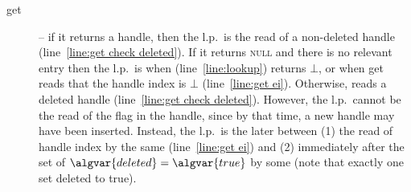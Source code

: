 \begin{description}
\item[get] -- if it returns a handle, then the l.p.\ is the read of a non-deleted handle (line~\ref{line:get check deleted}).
If it returns \textsc{null} 
and there is no relevant entry then the l.p.\ is when  (line~\ref{line:lookup}) returns $\bot$, or when get reads that the handle index is $\bot$ (line~\ref{line:get ei}).
Otherwise,  reads a deleted handle (line~\ref{line:get check deleted}). However, the l.p.\ cannot be the read of the  flag in the handle, since by that time, a new handle may have been inserted. 
Instead, 
the l.p.\ is the later between (1) the read of handle index by the same   (line~\ref{line:get ei}) 
and (2) immediately after the set of  $\algvar{deleted}=\algvar{true}$ by some   (note that exactly one  set deleted to true).

\end{description}

